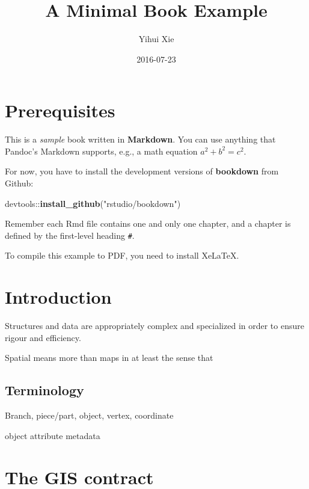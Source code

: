 \documentclass[]{book}
\title{A Minimal Book Example}
\author{Yihui Xie}
\date{2016-07-23}
\newenvironment{Shaded}{\begin{snugshade}}{\end{snugshade}}
\newcommand{\KeywordTok}[1]{\textcolor[rgb]{0.13,0.29,0.53}{\textbf{{#1}}}}
\newcommand{\StringTok}[1]{\textcolor[rgb]{0.31,0.60,0.02}{{#1}}}
\newcommand{\NormalTok}[1]{{#1}}
\begin{document}
\maketitle

{
\setcounter{tocdepth}{1}
\tableofcontents
}
\chapter{Prerequisites}\label{prerequisites}

This is a \emph{sample} book written in \textbf{Markdown}. You can use
anything that Pandoc's Markdown supports, e.g., a math equation
\(a^2 + b^2 = c^2\).

For now, you have to install the development versions of
\textbf{bookdown} from Github:

\begin{Shaded}
\begin{Highlighting}[]
\NormalTok{devtools::}\KeywordTok{install_github}\NormalTok{(}\StringTok{"rstudio/bookdown"}\NormalTok{)}
\end{Highlighting}
\end{Shaded}

Remember each Rmd file contains one and only one chapter, and a chapter
is defined by the first-level heading \texttt{\#}.

To compile this example to PDF, you need to install XeLaTeX.

\chapter{Introduction}\label{intro}

Structures and data are appropriately complex and specialized in order
to ensure rigour and efficiency.

Spatial means more than maps in at least the sense that

\section{Terminology}\label{terminology}

Branch, piece/part, object, vertex, coordinate

object attribute metadata

\chapter{The GIS contract}\label{the-gis-contract}
\end{document}
